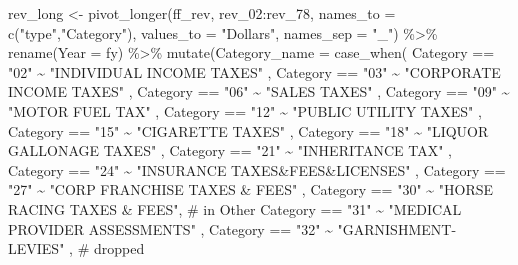 \documentclass[
  letterpaper,
  DIV=11,
  numbers=noendperiod]{scrreport}
\newenvironment{Shaded}{\begin{snugshade}}{\end{snugshade}}
\newcommand{\AttributeTok}[1]{\textcolor[rgb]{0.40,0.45,0.13}{#1}}
\newcommand{\CommentTok}[1]{\textcolor[rgb]{0.37,0.37,0.37}{#1}}
\newcommand{\FunctionTok}[1]{\textcolor[rgb]{0.28,0.35,0.67}{#1}}
\newcommand{\NormalTok}[1]{\textcolor[rgb]{0.00,0.23,0.31}{#1}}
\newcommand{\OtherTok}[1]{\textcolor[rgb]{0.00,0.23,0.31}{#1}}
\newcommand{\SpecialCharTok}[1]{\textcolor[rgb]{0.37,0.37,0.37}{#1}}
\newcommand{\StringTok}[1]{\textcolor[rgb]{0.13,0.47,0.30}{#1}}
\begin{document}
\begin{Shaded}
\begin{Highlighting}[]
\NormalTok{rev\_long }\OtherTok{\textless{}{-}} \FunctionTok{pivot\_longer}\NormalTok{(ff\_rev, rev\_02}\SpecialCharTok{:}\NormalTok{rev\_78, }\AttributeTok{names\_to =} \FunctionTok{c}\NormalTok{(}\StringTok{"type"}\NormalTok{,}\StringTok{"Category"}\NormalTok{), }\AttributeTok{values\_to =} \StringTok{"Dollars"}\NormalTok{, }\AttributeTok{names\_sep =} \StringTok{"\_"}\NormalTok{) }\SpecialCharTok{\%\textgreater{}\%} 
  \FunctionTok{rename}\NormalTok{(}\AttributeTok{Year =}\NormalTok{ fy) }\SpecialCharTok{\%\textgreater{}\%}
  \FunctionTok{mutate}\NormalTok{(}\AttributeTok{Category\_name =} \FunctionTok{case\_when}\NormalTok{(}
\NormalTok{    Category }\SpecialCharTok{==} \StringTok{"02"} \SpecialCharTok{\textasciitilde{}} \StringTok{"INDIVIDUAL INCOME TAXES"}\NormalTok{ ,}
\NormalTok{    Category }\SpecialCharTok{==} \StringTok{"03"} \SpecialCharTok{\textasciitilde{}} \StringTok{"CORPORATE INCOME TAXES"}\NormalTok{ ,}
\NormalTok{    Category }\SpecialCharTok{==} \StringTok{"06"} \SpecialCharTok{\textasciitilde{}} \StringTok{"SALES TAXES"}\NormalTok{ ,}
\NormalTok{    Category }\SpecialCharTok{==} \StringTok{"09"} \SpecialCharTok{\textasciitilde{}} \StringTok{"MOTOR FUEL TAX"}\NormalTok{ ,}
\NormalTok{    Category }\SpecialCharTok{==} \StringTok{"12"} \SpecialCharTok{\textasciitilde{}} \StringTok{"PUBLIC UTILITY TAXES"}\NormalTok{ ,}
\NormalTok{    Category }\SpecialCharTok{==} \StringTok{"15"} \SpecialCharTok{\textasciitilde{}} \StringTok{"CIGARETTE TAXES"}\NormalTok{ ,}
\NormalTok{    Category }\SpecialCharTok{==} \StringTok{"18"} \SpecialCharTok{\textasciitilde{}} \StringTok{"LIQUOR GALLONAGE TAXES"}\NormalTok{ ,}
\NormalTok{    Category }\SpecialCharTok{==} \StringTok{"21"} \SpecialCharTok{\textasciitilde{}} \StringTok{"INHERITANCE TAX"}\NormalTok{ ,}
\NormalTok{    Category }\SpecialCharTok{==} \StringTok{"24"} \SpecialCharTok{\textasciitilde{}} \StringTok{"INSURANCE TAXES\&FEES\&LICENSES"}\NormalTok{ ,}
\NormalTok{    Category }\SpecialCharTok{==} \StringTok{"27"} \SpecialCharTok{\textasciitilde{}} \StringTok{"CORP FRANCHISE TAXES \& FEES"}\NormalTok{ ,}
\NormalTok{    Category }\SpecialCharTok{==} \StringTok{"30"} \SpecialCharTok{\textasciitilde{}} \StringTok{"HORSE RACING TAXES \& FEES"}\NormalTok{,  }\CommentTok{\# in Other}
\NormalTok{    Category }\SpecialCharTok{==} \StringTok{"31"} \SpecialCharTok{\textasciitilde{}} \StringTok{"MEDICAL PROVIDER ASSESSMENTS"}\NormalTok{ ,}
\NormalTok{    Category }\SpecialCharTok{==} \StringTok{"32"} \SpecialCharTok{\textasciitilde{}} \StringTok{"GARNISHMENT{-}LEVIES"}\NormalTok{ , }\CommentTok{\# dropped}

\end{Highlighting}
\end{Shaded}
\end{document}

